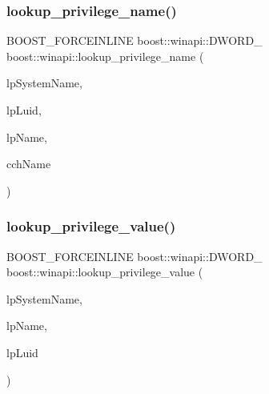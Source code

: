 \mbox{\label{namespaceboost_1_1winapi_a0c424379b531014655423109a507ad29}} 
\subsubsection{\texorpdfstring{lookup\+\_\+privilege\+\_\+name()}{lookup\_privilege\_name()}\hspace{0.1cm}{\footnotesize\ttfamily [2/2]}}
{\footnotesize\ttfamily B\+O\+O\+S\+T\+\_\+\+F\+O\+R\+C\+E\+I\+N\+L\+I\+NE boost\+::winapi\+::\+D\+W\+O\+R\+D\+\_\+ boost\+::winapi\+::lookup\+\_\+privilege\+\_\+name (\begin{DoxyParamCaption}\item[{boost\+::winapi\+::\+L\+P\+C\+W\+S\+T\+R\+\_\+}]{lp\+System\+Name,  }\item[{\mbox{\hyperlink{namespaceboost_1_1winapi_a9c163fdf2c6f3909b7d5af5652bc6727}{boost\+::winapi\+::\+P\+L\+U\+I\+D\+\_\+}}}]{lp\+Luid,  }\item[{\+\_\+\+Out\+\_\+writes\+\_\+to\+\_\+opt\+\_\+ $\ast$, $\ast$+1cch\+Display\+Name boost\+::winapi\+::\+L\+P\+W\+S\+T\+R\+\_\+}]{lp\+Name,  }\item[{boost\+::winapi\+::\+L\+P\+D\+W\+O\+R\+D\+\_\+}]{cch\+Name }\end{DoxyParamCaption})}

\mbox{\label{namespaceboost_1_1winapi_ac0088225aa92fe84699d2a723816566d}} 
\subsubsection{\texorpdfstring{lookup\+\_\+privilege\+\_\+value()}{lookup\_privilege\_value()}\hspace{0.1cm}{\footnotesize\ttfamily [1/2]}}
{\footnotesize\ttfamily B\+O\+O\+S\+T\+\_\+\+F\+O\+R\+C\+E\+I\+N\+L\+I\+NE boost\+::winapi\+::\+D\+W\+O\+R\+D\+\_\+ boost\+::winapi\+::lookup\+\_\+privilege\+\_\+value (\begin{DoxyParamCaption}\item[{boost\+::winapi\+::\+L\+P\+C\+S\+T\+R\+\_\+}]{lp\+System\+Name,  }\item[{boost\+::winapi\+::\+L\+P\+C\+S\+T\+R\+\_\+}]{lp\+Name,  }\item[{\mbox{\hyperlink{namespaceboost_1_1winapi_a9c163fdf2c6f3909b7d5af5652bc6727}{boost\+::winapi\+::\+P\+L\+U\+I\+D\+\_\+}}}]{lp\+Luid }\end{DoxyParamCaption})}

